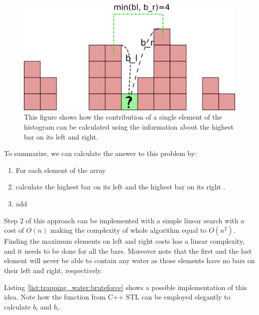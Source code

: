 \begin{figure}
		\label{fig:trapping_water_example3}
		\centering
		\includegraphics[scale=1.0]{sources/trapping_water/images/example3}
		\caption{This figure shows how the contribution of a single element of the histogram can be calculated using the information about the highest bar on its left and right.}
\end{figure}

To summarize, we can calculate the answer to this problem by:
\begin{enumerate}
	\item For each element of the array 
	\item calculate the highest bar on its left  and the highest bar on its right .
	\item add 
\end{enumerate}

Step $2$ of this approach can be implemented with a simple linear search with a cost of $O(n)$ making the complexity of whole algorithm equal to $O(n^2)$. Finding the maximum elements on left and right costs has a linear complexity, and it needs to be done for all the bars.
Moreover note that the first and the last element will never be able to contain any water as those elements have no bars on their left and right, respectively.

Listing \ref{list:trapping_water:bruteforce} shows a possible implementation of this idea. Note how the  function from C++ STL can be employed elegantly to calculate $b_l$ and $b_r$.





